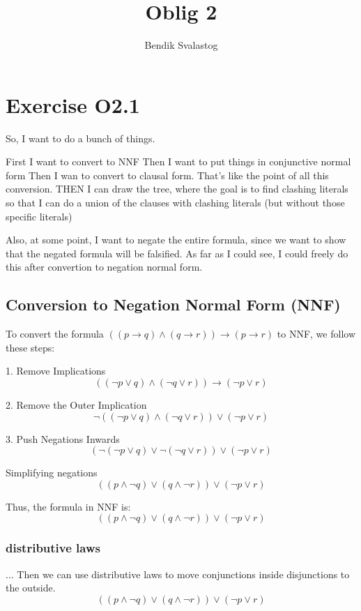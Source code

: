 \documentclass{article}
\title{Oblig 2}
\author{Bendik Svalastog}
\date{}
\begin{document}
\maketitle
\section*{Exercise O2.1}

So, I want to do a bunch of things.

First I want to convert to NNF
Then I want to put things in conjunctive normal form
Then I wan to convert to clausal form. That's like the point of all this conversion.
THEN I can draw the tree, where the goal is to find clashing literals so that I can do a union of the clauses with clashing literals (but without those specific literals) 

Also, at some point, I want to negate the entire formula, since we want to show that the negated formula will be falsified. As far as I could see, I could freely do this after convertion to negation normal form.


\subsection*{Conversion to Negation Normal Form (NNF)}

To convert the formula $((p \rightarrow q) \land (q \rightarrow r)) \rightarrow (p \rightarrow r)$ to NNF, we follow these steps:

1. Remove Implications
   \[
   ((\neg p \lor q) \land (\neg q \lor r)) \rightarrow (\neg p \lor r)
   \]

2. Remove the Outer Implication
   \[
   \neg ((\neg p \lor q) \land (\neg q \lor r)) \lor (\neg p \lor r)
   \]

3. Push Negations Inwards
   \[
   (\neg (\neg p \lor q) \lor \neg (\neg q \lor r)) \lor (\neg p \lor r)
   \]

   Simplifying negations
   \[
   ((p \land \neg q) \lor (q \land \neg r)) \lor (\neg p \lor r)
   \]

Thus, the formula in NNF is:
\[
((p \land \neg q) \lor (q \land \neg r)) \lor (\neg p \lor r)
\]

\subsubsection*{distributive laws}
... Then we can use distributive laws to move conjunctions inside disjunctions to the outside.
\[
((p \land \neg q) \lor (q \land \neg r)) \lor (\neg p \lor r)
\]
\end{document}
